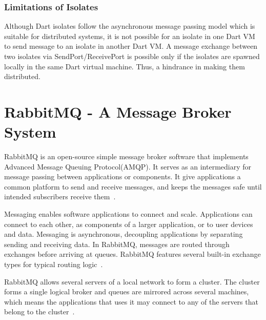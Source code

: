   \subsubsection{Limitations of Isolates}
  Although Dart isolates follow the asynchronous message passing model which is suitable for distributed systems, it is not possible for an isolate in one Dart VM to send message to an isolate in another Dart VM. A message exchange between two isolates via SendPort/ReceivePort is possible only if the isolates are spawned locally in the same Dart virtual machine. Thus, a hindrance in making them distributed.

\section{RabbitMQ - A Message Broker System}
\label{sec:rabbitmq}
  RabbitMQ is an open-source simple message broker software that implements Advanced Message Queuing Protocol(AMQP). It serves as an intermediary for message passing between applications or components. It give applications a common platform to send and receive messages, and keeps the messages safe until intended subscribers receive them~\cite{rabbitmqFeatures}.

  Messaging enables software applications to connect and scale. Applications can connect to each other, as components of a larger application, or to user devices and data. Messaging is asynchronous, decoupling applications by separating sending and receiving data. In RabbitMQ, messages are routed through exchanges before arriving at queues. RabbitMQ features several built-in exchange types for typical routing logic~\cite{rabbitmqFeatures}.

  RabbitMQ allows several servers of a local network to form a cluster. The cluster forms a single logical broker and queues are mirrored across several machines, which means the applications that uses it may connect to any of the servers that belong to the cluster~\cite{rabbitmqFeatures}.

